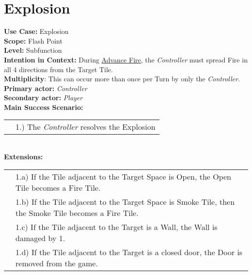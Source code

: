 \documentclass{article}
\begin{document}
	\section*{Explosion}
	\textbf{Use Case:} Explosion\\
	\textbf{Scope:} Flash Point\\
	\textbf{Level:} Subfunction\\
	\textbf{Intention in Context:} During \underline{Advance Fire}, the \textit{Controller} must spread Fire in all 4 directions from the Target Tile.\\
	\textbf{Multiplicity}: This can occur more than once per Turn by only the \textit{Controller}.\\
	\textbf{Primary actor:} \textit{Controller}\\
	\textbf{Secondary actor:} \textit{Player}\\
	\textbf{Main Success Scenario:}\\
	\begin{tabular}{l l}
		&1.) The \textit{Controller} resolves the Explosion\\
	\end{tabular}\\
	\textbf{Extensions: }\\
	\begin{tabular}{l l}
		&1.a) If the Tile adjacent to the Target Space is Open, the Open Tile becomes a Fire Tile.\\
		&1.b) If the Tile adjacent to the Target Space is Smoke Tile, then the Smoke Tile becomes a Fire Tile.\\
		&1.c) If the Tile adjacent to the Target is a Wall, the Wall is damaged by 1. \\
		&1.d) If the Tile adjacent to the Target is a closed door, the Door is removed from the game.\\
	\end{tabular}\\
\end{document}
